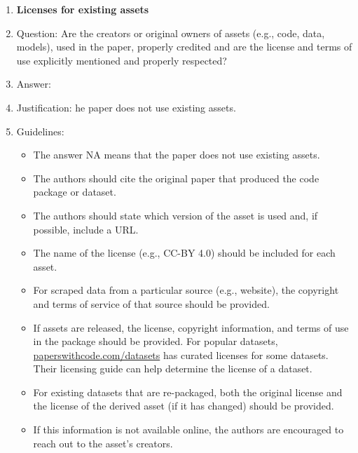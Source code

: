 \documentclass{article}
\begin{document}
\begin{enumerate}
\item {\bf Licenses for existing assets}
    \item[] Question: Are the creators or original owners of assets (e.g., code, data, models), used in the paper, properly credited and are the license and terms of use explicitly mentioned and properly respected?
    \item[] Answer: \answerNA{} %
    \item[] Justification: he paper does not use existing assets.
    \item[] Guidelines:
    \begin{itemize}
        \item The answer NA means that the paper does not use existing assets.
        \item The authors should cite the original paper that produced the code package or dataset.
        \item The authors should state which version of the asset is used and, if possible, include a URL.
        \item The name of the license (e.g., CC-BY 4.0) should be included for each asset.
        \item For scraped data from a particular source (e.g., website), the copyright and terms of service of that source should be provided.
        \item If assets are released, the license, copyright information, and terms of use in the package should be provided. For popular datasets, \url{paperswithcode.com/datasets} has curated licenses for some datasets. Their licensing guide can help determine the license of a dataset.
        \item For existing datasets that are re-packaged, both the original license and the license of the derived asset (if it has changed) should be provided.
        \item If this information is not available online, the authors are encouraged to reach out to the asset's creators.
    \end{itemize}


\end{enumerate}
\end{document}
